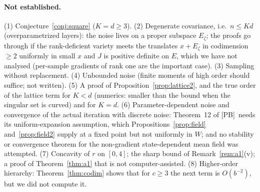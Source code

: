 \documentclass[10pt]{article}
\theoremstyle{definition}
\theoremstyle{remark}
\newcommand{\PB}{\textup{[PB]}}
\begin{document}
\paragraph{Not established.}
(1) Conjecture~\ref{conj:square} ($K=d\ge3$). (2) Degenerate covariance, i.e.\ $n\le Kd$ (overparametrized layers): the
noise lives on a proper subspace $E_\zeta$; the proofs go through if the rank-deficient variety meets the translates
$x+E_\zeta$ in codimension $\ge2$ uniformly in small $x$ and $J$ is positive definite on $E$, which we have not
analysed (per-sample gradients of rank one are the important case). (3) Sampling without replacement. (4) Unbounded
noise (finite moments of high order should suffice; not written). (5) A proof of Proposition~\ref{prop:lattice2}, and
the true order of the lattice term for $K<d$ (numerics: smaller than the bound when the singular set is curved) and for
$K=d$. (6) Parameter-dependent noise and convergence of the actual iteration with discrete noise: Theorem~12 of \PB\
needs its uniform-expansion assumption, which Propositions~\ref{prop:field} and~\ref{prop:field2} supply at a fixed
point but not uniformly in $W$; and no stability or convergence theorem for the non-gradient state-dependent mean field
was attempted. (7) Concavity of $r$ on $[0,4]$; the sharp bound of Remark~\ref{rem:a1}(v); a proof of
Theorem~\ref{thm:a1} that is not computer-assisted. (8) Higher-order hierarchy: Theorem~\ref{thm:codim} shows that for
$c\ge3$ the next term is $O(b^{-2})$, but we did not compute it.
\end{document}
